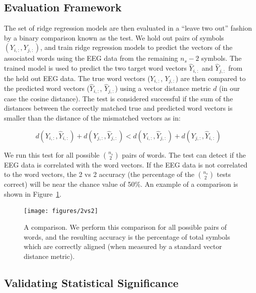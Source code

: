 \subsection{Evaluation Framework}

The set of ridge regression models are then evaluated in a ``leave two out'' 
fashion by a binary comparison known as the \tvt test. We hold out pairs of 
symbols $(Y_{i,:}, Y_{j,:})$, and train ridge regression models to predict the 
vectors of the associated words using the EEG data from the remaining $n_s-2$ 
symbols.  The trained model is used to predict the two target word vectors 
$\hat{Y}_{i,:}$ and $\hat{Y}_{j,:}$ from the held out EEG data. The true word 
vectors ($Y_{i,:}$, $Y_{j,:}$) are then compared to the predicted word vectors 
($\hat{Y}_{i,:}$, $\hat{Y}_{j,:}$) using a vector distance metric $d$ (in our 
case the cosine distance). The \tvt test is considered successful if the sum of 
the distances between the correctly matched true and predicted word vectors is 
smaller than the distance of the mismatched vectors as in: 
  
\begin{equation}
  d(Y_{i,:}, \hat{Y}_{i,:}) + d(Y_{j,:}, \hat{Y}_{j,:}) < 
  d(Y_{i,:}, \hat{Y}_{j,:}) + d(Y_{j,:}, \hat{Y}_{i,:})
  \label{eq:2vs2}
\end{equation}

\noindent We run this test for all possible ${\binom{n_s}{2}}$ pairs of words.  
The \tvt test can detect if the EEG data is correlated with the word vectors.  
If the EEG data is not correlated to the word vectors, the 2 vs 2 accuracy (the 
percentage of the ${\binom{n_s}{2}}$ \tvt tests correct) will be  near the 
chance value of 50\%. An example of a \tvt comparison is shown in 
Figure~\ref{fig:2vs2}. 

\begin{figure}[!t]
  \centering
  \texttt{[image: figures/2vs2]}
  \caption[The \tvt Comparison]{
    A \tvt comparison. We perform this comparison for all possible pairs of 
    words, and the resulting \tvt accuracy is the percentage of total symbols 
    which are correctly aligned (when measured by a standard vector distance 
    metric).
  }
  \label{fig:2vs2}
\end{figure}

\subsection{Validating Statistical Significance}

